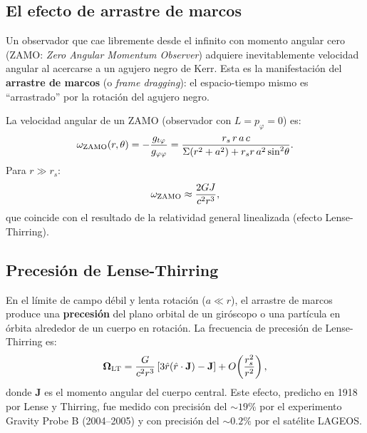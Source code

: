 \subsection{El efecto de arrastre de marcos}

Un observador que cae libremente desde el infinito con momento angular cero (ZAMO: \textit{Zero Angular Momentum Observer}) adquiere inevitablemente velocidad angular al acercarse a un agujero negro de Kerr. Esta es la manifestación del \textbf{arrastre de marcos} (o \textit{frame dragging}): el espacio-tiempo mismo es ``arrastrado'' por la rotación del agujero negro.

La velocidad angular de un ZAMO (observador con $L = p_\varphi = 0$) es:
\begin{equation}
  \omega_{\rm ZAMO}(r, \theta) = -\frac{g_{t\varphi}}{g_{\varphi\varphi}}
  = \frac{r_s\,r\,a\,c}{\Sigma(r^2 + a^2) + r_s r\,a^2\sin^2\!\theta}.
  \label{eq:omega_zamo}
\end{equation}
Para $r \gg r_s$:
\begin{equation}
  \omega_{\rm ZAMO} \approx \frac{2GJ}{c^2 r^3},
  \label{eq:arrastre_lejano}
\end{equation}
que coincide con el resultado de la relatividad general linealizada (efecto Lense-Thirring).

\subsection{Precesión de Lense-Thirring}

En el límite de campo débil y lenta rotación ($a \ll r$), el arrastre de marcos produce una \textbf{precesión} del plano orbital de un giróscopo o una partícula en órbita alrededor de un cuerpo en rotación. La frecuencia de precesión de Lense-Thirring es:
\begin{equation}
  \boldsymbol{\Omega}_{\rm LT} = \frac{G}{c^2 r^3}\left[3\hat{r}(\hat{r}\cdot\mathbf{J}) - \mathbf{J}\right]
  + O\!\left(\frac{r_s^2}{r^2}\right),
  \label{eq:lense_thirring}
\end{equation}
donde $\mathbf{J}$ es el momento angular del cuerpo central. Este efecto, predicho en 1918 por Lense y Thirring, fue medido con precisión del $\sim 19\%$ por el experimento Gravity Probe B (2004--2005) y con precisión del $\sim 0.2\%$ por el satélite LAGEOS.

